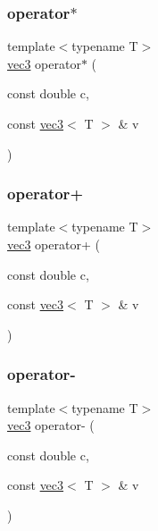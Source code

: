 \subsubsection{\texorpdfstring{operator$\ast$}{operator*}}
{\footnotesize\ttfamily template$<$typename T$>$ \\
\mbox{\hyperlink{structvec3}{vec3}} operator$\ast$ (\begin{DoxyParamCaption}\item[{const double}]{c,  }\item[{const \mbox{\hyperlink{structvec3}{vec3}}$<$ T $>$ \&}]{v }\end{DoxyParamCaption})\hspace{0.3cm}{\ttfamily [friend]}}

\mbox{\label{structvec3_a5a4f97c459eb49bb2e18ed9f0e486114}} 
\subsubsection{\texorpdfstring{operator+}{operator+}}
{\footnotesize\ttfamily template$<$typename T$>$ \\
\mbox{\hyperlink{structvec3}{vec3}} operator+ (\begin{DoxyParamCaption}\item[{const double}]{c,  }\item[{const \mbox{\hyperlink{structvec3}{vec3}}$<$ T $>$ \&}]{v }\end{DoxyParamCaption})\hspace{0.3cm}{\ttfamily [friend]}}

\mbox{\label{structvec3_a3daa3a334acdaef0cebfb9cb8b7c2992}} 
\subsubsection{\texorpdfstring{operator-\/}{operator-}}
{\footnotesize\ttfamily template$<$typename T$>$ \\
\mbox{\hyperlink{structvec3}{vec3}} operator-\/ (\begin{DoxyParamCaption}\item[{const double}]{c,  }\item[{const \mbox{\hyperlink{structvec3}{vec3}}$<$ T $>$ \&}]{v }\end{DoxyParamCaption})\hspace{0.3cm}{\ttfamily [friend]}}

